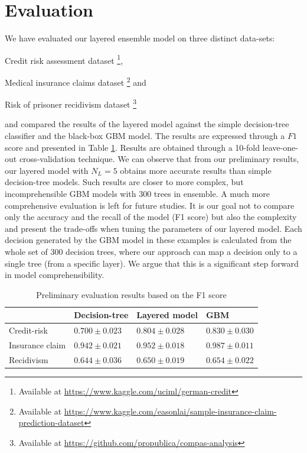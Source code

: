 \documentclass[runningheads]{llncs}
\begin{document}
\newpage
\section{Evaluation}
\label{sec_evaluation}

We have evaluated our layered ensemble model on three distinct data-sets:
\begin{enumerate*}[label=(\arabic*)]
    \item Credit risk assessment dataset \footnote{\scriptsize{Available at \url{https://www.kaggle.com/uciml/german-credit}}},
    \item Medical insurance claims dataset \footnote{\scriptsize{Available at \url{https://www.kaggle.com/easonlai/sample-insurance-claim-prediction-dataset}}} and
    \item Risk of prisoner recidivism dataset
    \footnote{\scriptsize{Available at \url{https://github.com/propublica/compas-analysis}}}
\end{enumerate*}
and compared the results of the layered model against the simple decision-tree classifier and the black-box GBM model. The results are expressed through a $F1$ score \cite{Goutte:2005:PIP:2149960.2149993} and presented in Table \ref{tab_results}. Results are obtained through a 10-fold leave-one-out cross-validation technique. We can observe that from our preliminary results, our layered model with $N_L=5$ obtains more accurate results than simple decision-tree models. Such results are closer to more complex, but incomprehensible GBM models with 300 trees in ensemble. A much more comprehensive evaluation is left for future studies. It is our goal not to compare only the accuracy and the recall of the model (F1 score) but also the complexity and present the trade-offs when tuning the parameters of our layered model. Each decision generated by the GBM model in these examples is calculated from the whole set of 300 decision trees, where our approach can map a decision only to a single tree (from a specific layer). We argue that this is a significant step forward in model comprehensibility. 

\begin{table}[]
\footnotesize
\renewcommand{\arraystretch}{0.9}
\setlength{\tabcolsep}{0.5em} %
\begin{center}
\begin{tabular}{@{}llll@{}}
\toprule
                & Decision-tree         & Layered model         & GBM                \\ \midrule
Credit-risk     & $0.700\pm0.023$       &   $0.804\pm0.028$     &   $0.830\pm0.030$  \\
Insurance claim & $0.942\pm0.021$       &   $0.952\pm0.018$     &   $0.987\pm0.011$  \\
Recidivism      & $0.644\pm0.036$       &   $0.650\pm0.019$     &   $0.654\pm0.022$  \\ \bottomrule
\end{tabular}
\end{center}
\label{tab_results}
\caption{Preliminary evaluation results based on the F1 score}
\end{table}
\FloatBarrier
\end{document}
